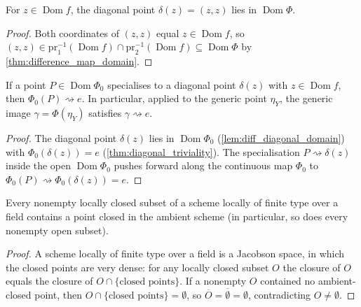 \begin{lemma}
  \label{lem:diff_diagonal_domain}
  \leanok
  For \(z \in \operatorname{Dom} f\), the diagonal point \(\delta(z) = (z, z)\)
  lies in \(\operatorname{Dom}\Phi\).
\end{lemma}
\begin{proof}
  \leanok
  Both coordinates of \((z, z)\) equal \(z \in \operatorname{Dom} f\), so
  \((z, z) \in \mathrm{pr}_1^{-1}(\operatorname{Dom} f) \cap
  \mathrm{pr}_2^{-1}(\operatorname{Dom} f) \subseteq \operatorname{Dom}\Phi\) by
  \ref{thm:difference_map_domain}.
\end{proof}

\begin{theorem}
  \label{thm:generic_image_specializes_unit}
  \leanok
  If a point \(P \in \operatorname{Dom}\Phi_0\) specialises to a diagonal point
  \(\delta(z)\) with \(z \in \operatorname{Dom} f\), then \(\Phi_0(P)
  \rightsquigarrow e\). In particular, applied to the generic point \(\eta_Y\),
  the generic image \(\gamma = \Phi(\eta_Y)\) satisfies \(\gamma
  \rightsquigarrow e\).
\end{theorem}
\begin{proof}
  \leanok
  The diagonal point \(\delta(z)\) lies in \(\operatorname{Dom}\Phi_0\)
  (\ref{lem:diff_diagonal_domain}) with \(\Phi_0(\delta(z)) = e\)
  (\ref{thm:diagonal_triviality}). The specialisation \(P \rightsquigarrow
  \delta(z)\) inside the open \(\operatorname{Dom}\Phi_0\) pushes forward along
  the continuous map \(\Phi_0\) to \(\Phi_0(P) \rightsquigarrow
  \Phi_0(\delta(z)) = e\).
\end{proof}

\begin{lemma}
  \label{lem:jacobson_closed_points}
  \leanok
  Every nonempty locally closed subset of a scheme locally of finite type over a
  field contains a point closed in the ambient scheme (in particular, so does
  every nonempty open subset).
\end{lemma}
\begin{proof}
  \leanok
  A scheme locally of finite type over a field is a Jacobson space, in which the
  closed points are very dense: for any locally closed subset \(O\) the closure
  of \(O\) equals the closure of \(O \cap \{\text{closed points}\}\). If a
  nonempty \(O\) contained no ambient-closed point, then \(O \cap \{\text{closed
  points}\} = \emptyset\), so \(\overline{O} = \overline{\emptyset} =
  \emptyset\), contradicting \(O \neq \emptyset\).
\end{proof}

